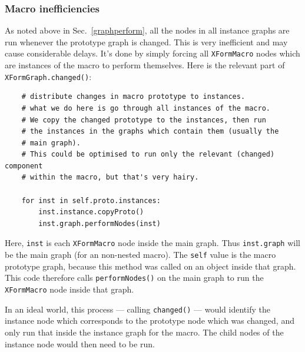 \subsubsection{Macro inefficiencies}
\label{macroineff}
As noted above in Sec.~\ref{graphperform}, all the nodes in all instance
graphs are run whenever the prototype graph is changed. This is very
inefficient and may cause considerable delays. It's done by simply forcing all
\texttt{XFormMacro} nodes which are instances of the macro to perform themselves. Here
is the relevant part of \texttt{XFormGraph.changed()}:
\begin{lstlisting}
    # distribute changes in macro prototype to instances.
    # what we do here is go through all instances of the macro. 
    # We copy the changed prototype to the instances, then run
    # the instances in the graphs which contain them (usually the
    # main graph).
    # This could be optimised to run only the relevant (changed) component
    # within the macro, but that's very hairy.

    for inst in self.proto.instances:
        inst.instance.copyProto()
        inst.graph.performNodes(inst)
\end{lstlisting}
Here, \texttt{inst} is each \texttt{XFormMacro} node inside the main graph. Thus
\texttt{inst.graph} will be the main graph (for an non-nested macro). The
\texttt{self} value is the macro prototype graph, because this
method was called on an object inside that graph. This code therefore calls
\texttt{performNodes()} on the main graph to run the \texttt{XFormMacro} node inside
that graph. 

In an ideal world, this process --- calling \texttt{changed()} --- would identify
the instance node which corresponds to the prototype node which was changed, and only
run that inside the instance graph for the macro. The child nodes of the instance node
would then need to be run.

